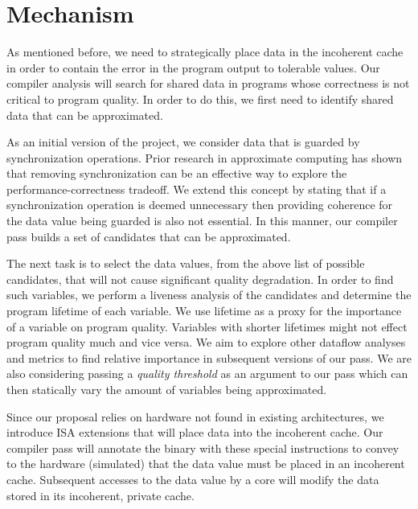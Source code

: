 \documentclass[12pt,conference]{IEEEtran}
\begin{document}
\section{Mechanism}

As mentioned before, we need to strategically place data
in the incoherent cache in order to contain the error in the 
program output to tolerable values. Our compiler analysis will search
for shared data in programs whose correctness is not critical to 
program quality. In order to do this, we first need to identify 
shared data that can be approximated. 

As an initial version of the project, we consider data 
that is guarded by synchronization operations. Prior research 
in approximate computing has shown that removing synchronization 
can be an effective way to explore the performance-correctness 
tradeoff. We extend this concept by stating that if a
synchronization operation is deemed unnecessary then 
providing coherence for the data value being guarded is also 
not essential. In this manner, our compiler pass builds a 
set of candidates that can be approximated. 

The next task is to select the data values, from the 
above list of possible candidates, that will not cause 
significant quality degradation. In order to find such
variables, we perform a liveness analysis of the candidates 
and determine the program lifetime of each variable. We use
lifetime as a proxy for the importance of a variable on program
quality. Variables with shorter lifetimes might not effect program 
quality much and vice versa. We aim to explore other dataflow 
analyses and metrics to find relative importance in subsequent
versions of our pass. We are also considering passing a 
\emph{quality threshold} as an argument to our pass which can then statically vary the
amount of variables being approximated. 

Since our proposal relies on hardware not found in existing 
architectures, we introduce ISA extensions that will place data into 
the incoherent cache. Our compiler pass will annotate the binary
with these special instructions to convey to the hardware (simulated) 
that the data value must be placed in an incoherent cache. Subsequent
accesses to the data value by a core will modify the data stored in its
incoherent, private cache. 
\end{document}
